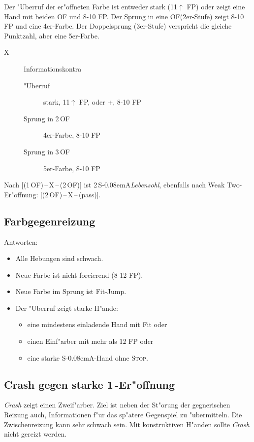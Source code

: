 \documentclass[11pt,german,twocolumn]{scrartcl}
\def\tre{\nobreak\,\Cl\xspace}
\def\pi{\Sp\xspace}
\def\co{\He\xspace}
\def\pl{$\uparrow$\xspace}
\def\of{\nobreak\textsf{\,OF}\xspace}
\def\ofa{\nobreak\textsf{OF}\xspace}
\def\sa{\nobreak\textsf{S\kern-0.08emA}\xspace}
\def\SA{\nobreak\,\sa}
\def\kontra{\textsf{X}\xspace}
\def\sep{\,--\,}
\newcommand{\conv}[1]{\emph{#1}}
\def\stp{\textsc{Stop}\xspace}
\def\bdsc{\begin{description}}
\def\edsc{\end{description}}
\newcommand{\Index}[1]{#1\index{#1}}
\begin{document}
Der "Uberruf der er"offneten Farbe ist entweder
stark (11\pl FP) oder zeigt eine Hand mit beiden \ofa und 8-10 FP. Der Sprung
in eine \ofa (2er-Stufe) zeigt 8-10 FP und eine 4er-Farbe. Der Doppelsprung
(3er-Stufe) verspricht die gleiche Punktzahl, aber eine 5er-Farbe.

\bdsc
\item[\kontra] Informationskontra
  \bdsc
  \item["Uberruf] stark, 11\pl FP, oder \pi{}+\co, 8-10 FP
  \item[Sprung in 2\of] 4er-Farbe, 8-10 FP
  \item[Sprung in 3\of] 5er-Farbe, 8-10 FP
  \edsc
\edsc

Nach [(1\of){}\sep\kontra{}\sep(2\of)] ist 2\SA \Index{\conv{Lebensohl}}, ebenfalls
nach \Index{Weak Two}-Er"offnung: [(2\of){}\sep\kontra{}\sep(pass)].

\subsection{Farbgegenreizung}

Antworten:

\begin{itemize}
\item Alle Hebungen sind schwach.
\item Neue Farbe ist nicht forcierend (8-12 FP).
\item Neue Farbe im Sprung ist Fit-Jump.
\item Der "Uberruf zeigt starke H"ande:
  \begin{itemize}
  \item eine mindestens einladende Hand mit Fit oder
  \item einen Einf"arber mit mehr als 12 FP oder
  \item eine starke \sa-Hand ohne \stp.
  \end{itemize}
\end{itemize}

\subsection{Crash gegen starke 1\tre-Er"offnung}

\conv{Crash} zeigt einen Zweif"arber. Ziel ist neben der St"orung der
gegnerischen Reizung auch, Informationen f"ur das sp"atere Gegenspiel
zu "ubermitteln.  Die Zwischenreizung kann sehr schwach sein.  Mit
konstruktiven H"anden sollte \conv{Crash} nicht gereizt werden.
\end{document}
